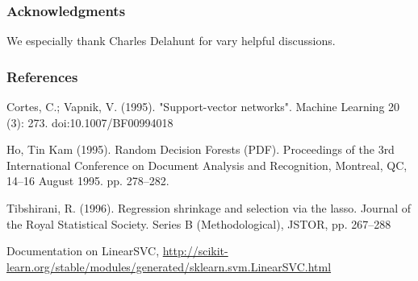 \documentclass{article} %
\begin{document}
\subsubsection*{Acknowledgments}

We especially thank Charles Delahunt for vary helpful discussions.

\subsubsection*{References}



\small{\begingroup
\renewcommand{\section}[2]{}%

\begin{thebibliography}{5}

    Cortes, C.; Vapnik, V. (1995). "Support-vector networks". Machine Learning 20 (3): 273. doi:10.1007/BF00994018
 
  Ho, Tin Kam (1995). Random Decision Forests (PDF). Proceedings of the 3rd
  International Conference on Document Analysis and Recognition, Montreal, QC, 14–16 August 1995. pp. 278–282.
 
  Tibshirani, R. (1996). Regression shrinkage and selection via the 
 lasso. Journal of the Royal Statistical Society. Series B (Methodological), 
 JSTOR, pp. 267--288
 
  Documentation on LinearSVC, 
 \url{http://scikit-learn.org/stable/modules/generated/sklearn.svm.LinearSVC.html}
 
\end{thebibliography}
\endgroup
\end{document}
